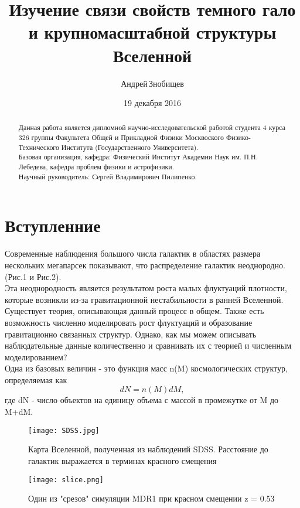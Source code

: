 \documentclass[11pt]{article}
\title{Изучение связи свойств темного гало и крупномасштабной структуры Вселенной}
\author{Андрей\,Знобищев}
\date{19 декабря 2016}
\begin{document}
\maketitle

\begin{abstract}
	Данная работа является дипломной научно-исследовательской работой студента 4 курса 326 группы Факультета Общей и Прикладной Физики Москвоского Физико-Технического Института (Государственного Университета). \\ 
	Базовая организация, кафедра: Физический Институт Академии Наук им. П.Н. Лебедева, кафедра проблем физики и астрофизики.
\\
	Научный руководитель: Сергей Владимирович Пилипенко. 
\end{abstract}

\section{Вступленние}
Современные наблюдения большого числа галактик в областях размера нескольких мегапарсек показывают, что распределение галактик неоднородно. (Рис.1 и Рис.2). \\
Эта неоднородность является результатом роста малых флуктуаций плотности, которые возникли из-за гравитационной нестабильности в ранней Вселенной. Существует теория, описывающая данный процесс в общем. Также есть возможность численно моделировать рост флуктуаций и образование гравитационно связанных структур. Однако, как мы можем описывать наблюдательные данные количественно и сравнивать их с теорией и численным моделированием? \\
Одна из базовых величин - это функция масс n(M) космологических структур, определяемая как\\
\begin{equation}
	dN = n(M)dM,
\end{equation}
где dN - число объектов на единицу объема с массой в промежутке от M до M+dM. 
 
\begin{figure}[h]
\centering
\texttt{[image: SDSS.jpg]}
\caption{Карта Вселенной, полученная из наблюдений SDSS. Расстояние до галактик выражается в терминах красного смещения}
\end{figure}
\begin{figure}[H]
\centering
\texttt{[image: slice.png]}
\caption{Один из "срезов" симуляции MDR1 при красном смещении z = 0.53 }  
\end{figure}
\end{document}
